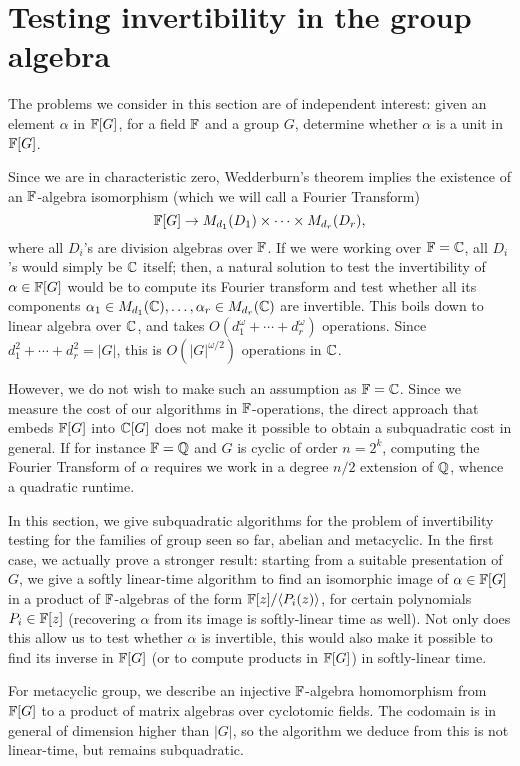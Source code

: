 \section{Testing invertibility in the group algebra}

The problems we consider in this section are of independent interest:
given an element $\alpha$ in $\mathbb{F}[G]$, for a field $\mathbb{F}$ and a group $G$,
determine whether $\alpha$ is a unit in $\mathbb{F}[G]$. 

Since we are in characteristic zero, Wedderburn's theorem implies the
existence of an $\mathbb{F}$-algebra isomorphism (which we will call a Fourier Transform)
$$\mathbb{F}[G] \to M_{d_1}(D_1) \times \dots \times M_{d_r}(D_r),$$ where all
$D_i$'s are division algebras over $\mathbb{F}$. If we were working over
$\mathbb{F}=\mathbb{C}$, all $D_i$'s would simply be $\mathbb{C}$ itself; then, a natural
solution to test the invertibility of $\alpha \in \mathbb{F}[G]$ would be to
compute its Fourier transform and test whether all its components
$\alpha_1 \in M_{d_1}(\mathbb{C}),\dots,\alpha_r \in M_{d_r}(\mathbb{C})$ are
invertible. This boils down to linear algebra over $\mathbb{C}$, and takes
$O(d_1^\omega + \cdots + d_r^\omega)$ operations.  Since $d_1^2 +
\cdots + d_r^2 = |G|$, this is $O(|G|^{\omega/2})$ operations in $\mathbb{C}$.

However, we do not wish to make such an assumption as $\mathbb{F}=\mathbb{C}$. Since
we measure the cost of our algorithms in $\mathbb{F}$-operations, the direct
approach that embeds $\mathbb{F}[G]$ into $\mathbb{C}[G]$ does not make it possible to
obtain a subquadratic cost in general. If for instance $\mathbb{F}=\mathbb{Q}$ and $G$
is cyclic of order $n=2^k$, computing the Fourier Transform of
$\alpha$ requires we work in a degree $n/2$ extension of $\mathbb{Q}$, whence
a quadratic runtime.

In this section, we give subquadratic algorithms for the problem of
invertibility testing for the families of group seen so far, abelian
and metacyclic. In the first case, we actually prove a stronger
result: starting from a suitable presentation of $G$, we give a softly
linear-time algorithm to find an isomorphic image of $\alpha \in
\mathbb{F}[G]$ in a product of $\mathbb{F}$-algebras of the form $\mathbb{F}[z]/\langle
P_i(z)\rangle$, for certain polynomials $P_i \in \mathbb{F}[z]$ (recovering
$\alpha$ from its image is softly-linear time as well). Not only does
this allow us to test whether $\alpha$ is invertible, this would also
make it possible to find its inverse in $\mathbb{F}[G]$ (or to compute
products in $\mathbb{F}[G]$) in softly-linear time.

For metacyclic group, we describe an injective $\mathbb{F}$-algebra
homomorphism from $\mathbb{F}[G]$ to a product of matrix algebras over
cyclotomic fields. The codomain is in general of dimension higher
than $|G|$, so the algorithm we deduce from this is not linear-time,
but remains subquadratic.

